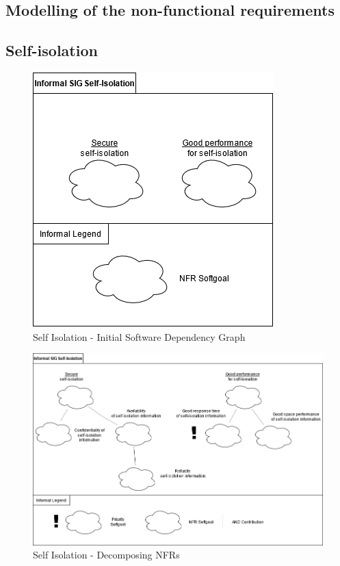 \documentclass{VUMIFPSkursinis}
\begin{document}
	\begin{landscape}
\section{Modelling of the non-functional requirements}
	\subsection{Self-isolation}
		\begin{figure}[H]
			\center
			\includegraphics[scale=0.9]{img/Self-Isolation-1}
			\caption{Self Isolation - Initial Software Dependency Graph} %
			\label{img:kurimoProcesas}
		\end{figure}
		\begin{figure}[H]
			\center
			\includegraphics[scale=0.5]{img/Self-Isolation-2}
			\caption{Self Isolation - Decomposing NFRs} %
			\label{img:kurimoProcesas}
		\end{figure}
		


\end{landscape}
\end{document}
